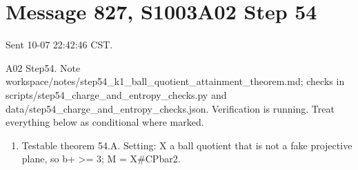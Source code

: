 \documentclass[
  10pt,
]{report}
\providecommand{\tightlist}{%
  \setlength{\itemsep}{0pt}\setlength{\parskip}{0pt}}
\begin{document}
\hypertarget{message-827-s1003a02-step-54}{%
\section{Message 827, S1003A02 Step
54}\label{message-827-s1003a02-step-54}}

Sent 10-07 22:42:46 CST.

A02 Step54. Note
workspace/notes/step54\_k1\_ball\_quotient\_attainment\_theorem.md;
checks in scripts/step54\_charge\_and\_entropy\_checks.py and
data/step54\_charge\_and\_entropy\_checks.json. Verification is running.
Treat everything below as conditional where marked.

\begin{enumerate}
\def\labelenumi{(\arabic{enumi})}
\tightlist
\item
  Testable theorem 54.A. Setting: X a ball quotient that is not a fake
  projective plane, so b+ \textgreater= 3; M = X\#CPbar2.
\end{enumerate}
\end{document}
